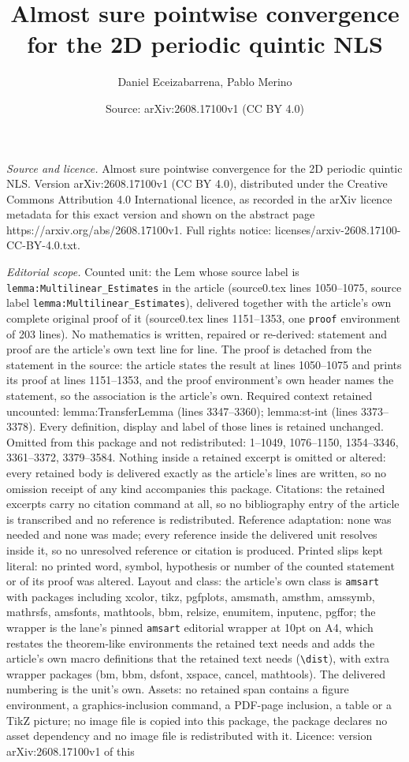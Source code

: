 \documentclass[10pt,a4paper]{amsart}
\title[Almost sure pointwise convergence for the 2D periodic quinti]{Almost sure pointwise convergence for the 2D periodic quintic NLS}
\author{Daniel Eceizabarrena, Pablo Merino}
\date{Source: arXiv:2608.17100v1 (CC BY 4.0)}
\begin{document}
\maketitle

\noindent\emph{Source and licence.} Almost sure pointwise convergence for the 2D periodic quintic NLS. Version arXiv:2608.17100v1 (CC BY 4.0), distributed under the Creative Commons Attribution 4.0 International licence, as recorded in the arXiv licence metadata for this exact version and shown on the abstract page https://arxiv.org/abs/2608.17100v1. Full rights notice: licenses/arxiv-2608.17100-CC-BY-4.0.txt.\par\smallskip

\noindent\textit{Editorial scope.} Counted unit: the Lem whose source label is \texttt{lemma:Multilinear\_Estimates} in the article (source0.tex lines 1050--1075, source label \texttt{lemma:Multilinear\_Estimates}), delivered together with the article's own complete original proof of it (source0.tex lines 1151--1353, one \texttt{proof} environment of 203 lines). No mathematics is written, repaired or re-derived: statement and proof are the article's own text line for line. The proof is detached from the statement in the source: the article states the result at lines 1050--1075 and prints its proof at lines 1151--1353, and the proof environment's own header names the statement, so the association is the article's own. Required context retained uncounted: lemma:TransferLemma (lines 3347--3360); lemma:st-int (lines 3373--3378). Every definition, display and label of those lines is retained unchanged. Omitted from this package and not redistributed: 1--1049, 1076--1150, 1354--3346, 3361--3372, 3379--3584. Nothing inside a retained excerpt is omitted or altered: every retained body is delivered exactly as the article's lines are written, so no omission receipt of any kind accompanies this package. Citations: the retained excerpts carry no citation command at all, so no bibliography entry of the article is transcribed and no reference is redistributed. Reference adaptation: none was needed and none was made; every reference inside the delivered unit resolves inside it, so no unresolved reference or citation is produced. Printed slips kept literal: no printed word, symbol, hypothesis or number of the counted statement or of its proof was altered. Layout and class: the article's own class is \texttt{amsart} with packages including xcolor, tikz, pgfplots, amsmath, amsthm, amssymb, mathrsfs, amsfonts, mathtools, bbm, relsize, enumitem, inputenc, pgffor; the wrapper is the lane's pinned \texttt{amsart} editorial wrapper at 10pt on A4, which restates the theorem-like environments the retained text needs and adds the article's own macro definitions that the retained text needs (\texttt{\textbackslash dist}), with extra wrapper packages (bm, bbm, dsfont, xspace, cancel, mathtools). The delivered numbering is the unit's own. Assets: no retained span contains a figure environment, a graphics-inclusion command, a PDF-page inclusion, a table or a TikZ picture; no image file is copied into this package, the package declares no asset dependency and no image file is redistributed with it. Licence: version arXiv:2608.17100v1 of this 
\end{document}
